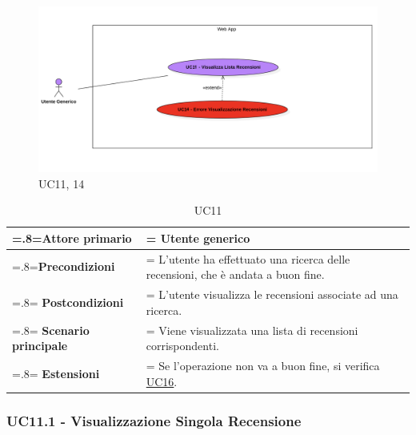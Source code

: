             \begin{figure}[H]
                \centering
                \includegraphics[scale=0.6]{src/img/UC11.png}
                \caption{UC11, 14}
            \end{figure}

            \begin{table}[H]
                \centering
                \renewcommand{\arraystretch}{1.8}
                \renewcommand\tabularxcolumn[1]{m{#1}}
                \begin{tabularx}{0.9\textwidth} {
                    >{\hsize=.8\hsize\linewidth=\hsize}X
                    >{\hsize=1.2\hsize\linewidth=\hsize}X}
                    \hline
                    \textbf{Attore primario} & Utente generico \\
                    \hline
                    \textbf{Precondizioni} & L'utente ha effettuato una ricerca delle recensioni, che è andata a buon fine. \\
                    \hline
                    \textbf{Postcondizioni} & L'utente visualizza le recensioni associate ad una ricerca. \\
                    \hline
                    \textbf{Scenario principale} & Viene visualizzata una lista di recensioni corrispondenti. \\
                    \hline
                    \textbf{Estensioni} & Se l'operazione non va a buon fine, si verifica \hyperref[UC16]{UC16}. \\
                    \hline
                \end{tabularx}
                \caption{UC11}
            \end{table}

        \subsubsection{UC11.1 - Visualizzazione Singola Recensione}
        \label{UC11.1}

